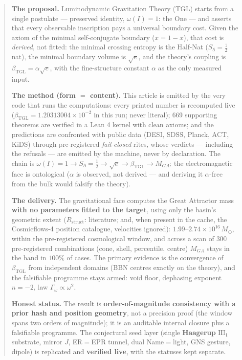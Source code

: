 \documentclass[11pt]{article}
\newcommand{\bTGL}{\beta_{\mathrm{TGL}}}\newcommand{\Msun}{M_{\odot}}\newcommand{\TGL}{\mathrm{TGL}}
\theoremstyle{definition}\newtheorem{deriv}{Derivation}
\begin{document}
\begin{abstract}

\textbf{The proposal.} Luminodynamic Gravitation Theory (TGL) starts from a single postulate --- preserved identity, $\omega(I)=1$: the One --- and asserts that every observable inscription pays a universal boundary cost. Given the axiom of the minimal self-conjugate boundary ($x=1-x$), that cost is \emph{derived}, not fitted: the minimal crossing entropy is the Half-Nat ($S_\partial=\tfrac12$ nat), the minimal boundary volume is $\sqrt e$, and the theory's coupling is $\bTGL=\alpha\sqrt e$, with the fine-structure constant $\alpha$ as the only measured input.

\textbf{The method (form $=$ content).} This article is emitted by the very code that runs the computations: every printed number is recomputed live ($\bTGL=1.20313004\times10^{-2}$ in this run; never literal); 669 supporting theorems are verified in a Lean 4 kernel with clean axioms; and the predictions are confronted with public data (DESI, SDSS, Planck, ACT, KiDS) through pre-registered \emph{fail-closed} rites, whose verdicts --- including the refusals --- are emitted by the machine, never by declaration. The chain is $\omega(I)=1\to S_\partial=\tfrac12\to\sqrt e\to\bTGL\to M_{GA}$; the electromagnetic face is ontological ($\alpha$ is observed, not derived --- and deriving it $\alpha$-free from the bulk would falsify the theory).

\textbf{The delivery.} The gravitational face computes the Great Attractor mass \textbf{with no parameters fitted to the target}, using only the basin's geometric extent ($R_{\mathrm{struct}}$: literature; and, when present in the cache, the Cosmicflows-4 position catalogue, velocities ignored): $1.99$--$2.74\times10^{16}\,\Msun$, within the pre-registered cosmological window, and across a scan of $300$ pre-registered combinations (cone, shell, percentile, centre) $M_{GA}$ stays in the band in $100\%$ of cases. The primary evidence is the convergence of $\bTGL$ from independent domains (BBN centres exactly on the theory), and the falsifiable programme stays armed: void floor, dephasing exponent $n=-2$, law $\Gamma_\omega\propto\omega^2$.

\textbf{Honest status.} The result is \textbf{order-of-magnitude consistency with a prior hash and position geometry}, not a precision proof (the window spans two orders of magnitude); it is an auditable internal closure plus a falsifiable programme. The conjectural seed layer (single \textbf{Haagerup} $\mathrm{III}_1$ substrate, mirror $J$, ER$=$EPR tunnel, dual Name$=$light, GNS gesture, dipole) is replicated and \textbf{verified live}, with the statuses kept separate.

\end{abstract}
\end{document}
